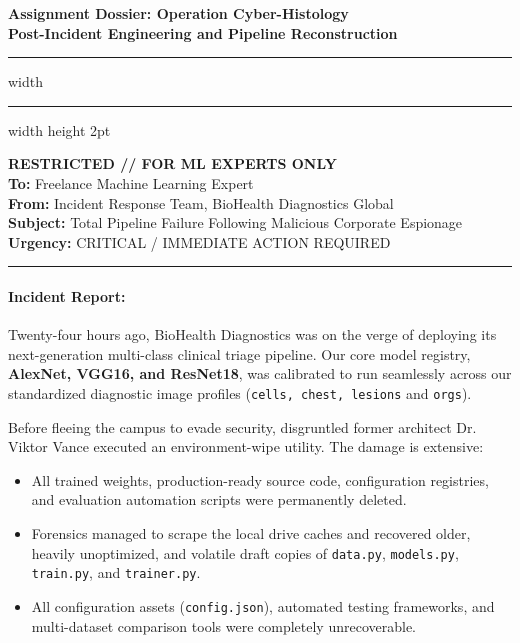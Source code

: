 \documentclass[11pt,a4paper]{article}
\begin{document}
\setlength{\parindent}{0pt}
\setlength{\parskip}{0.5ex plus 0.2ex minus 0.1ex}
\setlength\intextsep{0pt}

\begin{center}
    \LARGE \bfseries Assignment Dossier: Operation Cyber-Histology \\
    \vspace{0.2cm}
    \large {}\selectfont Post-Incident Engineering and Pipeline Reconstruction \\
\end{center}
\hrule width \hsize \kern 1mm \hrule width \hsize height 2pt 

\vspace{0.3cm}

\noindent \textbf{RESTRICTED // FOR ML EXPERTS ONLY} \\
\textbf{To:} Freelance Machine Learning Expert \\
\textbf{From:} Incident Response Team, BioHealth Diagnostics Global \\
\textbf{Subject:} Total Pipeline Failure Following Malicious Corporate Espionage \\
\textbf{Urgency:} CRITICAL / IMMEDIATE ACTION REQUIRED

\vspace{0.4cm}
\hrule

\paragraph{Incident Report:}
Twenty-four hours ago, BioHealth Diagnostics was on the verge of deploying its next-generation multi-class clinical triage pipeline. Our core model registry, \textbf{AlexNet, VGG16, and ResNet18}, was calibrated to run seamlessly across our standardized diagnostic image profiles (\texttt{cells, chest, lesions} and \texttt{orgs}).

Before fleeing the campus to evade security, disgruntled former architect Dr. Viktor Vance executed an environment-wipe utility. The damage is extensive:
\begin{itemize}[nosep, noitemsep]
    \item All trained weights, production-ready source code, configuration registries, and evaluation automation scripts were permanently deleted.
    \item Forensics managed to scrape the local drive caches and recovered older, heavily unoptimized, and volatile draft copies of \texttt{data.py}, \texttt{models.py}, \texttt{train.py}, and \texttt{trainer.py}. 
    \item All configuration assets (\texttt{config.json}), automated testing frameworks, and multi-dataset comparison tools were completely unrecoverable. 
\end{itemize}
\end{document}

